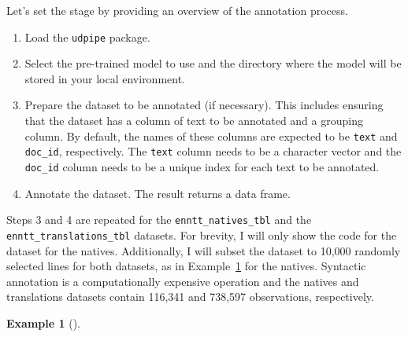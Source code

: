 \documentclass[
  letterpaper,
  DIV=11,
  numbers=noendperiod]{scrreprt}
\providecommand{\tightlist}{%
  \setlength{\itemsep}{0pt}\setlength{\parskip}{0pt}}\usepackage{longtable,booktabs,array}
\theoremstyle{definition}
\newtheorem{example}{Example}[chapter]
\theoremstyle{remark}
\begin{document}
Let's set the stage by providing an overview of the annotation process.

\begin{enumerate}
\def\labelenumi{\arabic{enumi}.}
\tightlist
\item
  Load the \texttt{udpipe} package.
\item
  Select the pre-trained model to use and the directory where the model
  will be stored in your local environment.
\item
  Prepare the dataset to be annotated (if necessary). This includes
  ensuring that the dataset has a column of text to be annotated and a
  grouping column. By default, the names of these columns are expected
  to be \texttt{text} and \texttt{doc\_id}, respectively. The
  \texttt{text} column needs to be a character vector and the
  \texttt{doc\_id} column needs to be a unique index for each text to be
  annotated.
\item
  Annotate the dataset. The result returns a data frame.
\end{enumerate}

Steps 3 and 4 are repeated for the \texttt{enntt\_natives\_tbl} and the
\texttt{enntt\_translations\_tbl} datasets. For brevity, I will only
show the code for the dataset for the natives. Additionally, I will
subset the dataset to 10,000 randomly selected lines for both datasets,
as in Example~\ref{exm-td-generation-subset-natives} for the natives.
Syntactic annotation is a computationally expensive operation and the
natives and translations datasets contain 116,341 and 738,597
observations, respectively.

\begin{example}[]\protect\hypertarget{exm-td-generation-subset-natives}{}\label{exm-td-generation-subset-natives}

~

\end{example}
\end{document}
